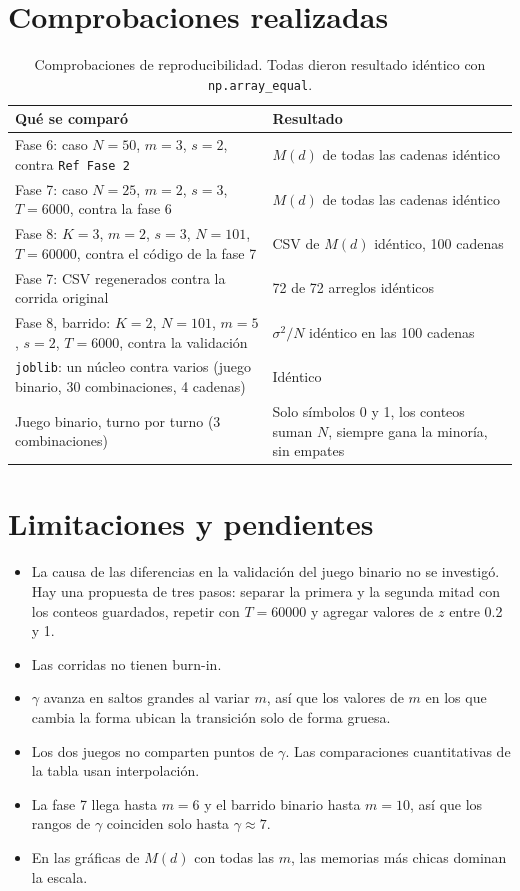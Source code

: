 \documentclass[11pt,letterpaper]{article}
\begin{document}
\section{Comprobaciones realizadas}
\begin{table}[H]
\centering\small
\caption{Comprobaciones de reproducibilidad. Todas dieron resultado idéntico con \texttt{np.array\_equal}.}
\begin{tabular}{p{7.3cm}p{7.3cm}}
\toprule
Qué se comparó & Resultado\\
\midrule
Fase 6: caso $N=50$, $m=3$, $s=2$, contra \texttt{Ref Fase 2} & $M(d)$ de todas las cadenas idéntico\\
Fase 7: caso $N=25$, $m=2$, $s=3$, $T=6000$, contra la fase 6 & $M(d)$ de todas las cadenas idéntico\\
Fase 8: $K=3$, $m=2$, $s=3$, $N=101$, $T=60000$, contra el código de la fase 7 & CSV de $M(d)$ idéntico, 100 cadenas\\
Fase 7: CSV regenerados contra la corrida original & 72 de 72 arreglos idénticos\\
Fase 8, barrido: $K=2$, $N=101$, $m=5$, $s=2$, $T=6000$, contra la validación & $\sigma^2/N$ idéntico en las 100 cadenas\\
\texttt{joblib}: un núcleo contra varios (juego binario, 30 combinaciones, 4 cadenas) & Idéntico\\
Juego binario, turno por turno (3 combinaciones) & Solo símbolos 0 y 1, los conteos suman $N$, siempre gana la minoría, sin empates\\
\bottomrule
\end{tabular}
\end{table}

\section{Limitaciones y pendientes}
\begin{itemize}
\item La causa de las diferencias en la validación del juego binario no se investigó. Hay una propuesta de tres pasos: separar la primera y la segunda mitad con los conteos guardados, repetir con $T=60000$ y agregar valores de $z$ entre 0.2 y 1.
\item Las corridas no tienen burn-in.
\item $\gamma$ avanza en saltos grandes al variar $m$, así que los valores de $m$ en los que cambia la forma ubican la transición solo de forma gruesa.
\item Los dos juegos no comparten puntos de $\gamma$. Las comparaciones cuantitativas de la tabla usan interpolación.
\item La fase 7 llega hasta $m=6$ y el barrido binario hasta $m=10$, así que los rangos de $\gamma$ coinciden solo hasta $\gamma\approx 7$.
\item En las gráficas de $M(d)$ con todas las $m$, las memorias más chicas dominan la escala.
\end{itemize}
\end{document}
